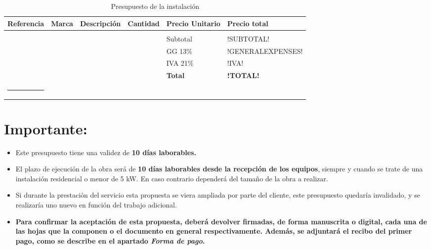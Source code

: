\vspace{0.5cm}


\begin{longtable}{M{2cm}M{1.5cm}M{4.5cm}M{1.5cm}M{1.75cm}M{2cm}}
\caption{Presupuesto de la instalación} \label{tab01-08}\\
\hline
\hline
\rule[-8pt]{0pt}{22pt}{\bfseries{Referencia}}& {\bfseries{Marca}} & {\bfseries{Descripción}} & {\bfseries{Cantidad}} & {\bfseries{Precio Unitario}} & {\bfseries{Precio total}} \\
\hline
\hline
& & & & & \\
\hline
\hline
\vspace{0.5cm}
  &        &                                          &    & Subtotal & !SUBTOTAL! \\
\vspace{0.5cm}
  &        &                                          &    & GG 13\% & !GENERALEXPENSES! \\
\vspace{0.5cm}
  &        &                                          &    & IVA 21\% & !IVA! \\
\vspace{0.5cm}
  &        &                                          &    & \textbf{Total} & \textbf{!TOTAL!} \\
\rule{15.7cm}{2pt}
\end{longtable}
				 
\section*{Importante:}

\begin{itemize}
\item Este presupuesto tiene una validez de \textbf{10 días laborables.}
\item El plazo de ejecución de la obra será de \textbf{10 días laborables desde la recepción de los equipos}, siempre y cuando se trate de una instalación residencial o menor de 5 kW. En caso contrario dependerá del tamaño de la obra a realizar.
\item Si durante la prestación del servicio esta propuesta se viera ampliada por parte del cliente, este presupuesto quedaría invalidado, y se realizaría uno nuevo en función del trabajo adicional.
\item \textbf{Para confirmar la aceptación de esta propuesta, deberá devolver firmadas, de forma manuscrita o digital, cada una de las hojas que la componen o el documento en general respectivamente. Además, se adjuntará el recibo del primer pago, como se describe en el apartado \textit{Forma de pago}.}
\end{itemize}

